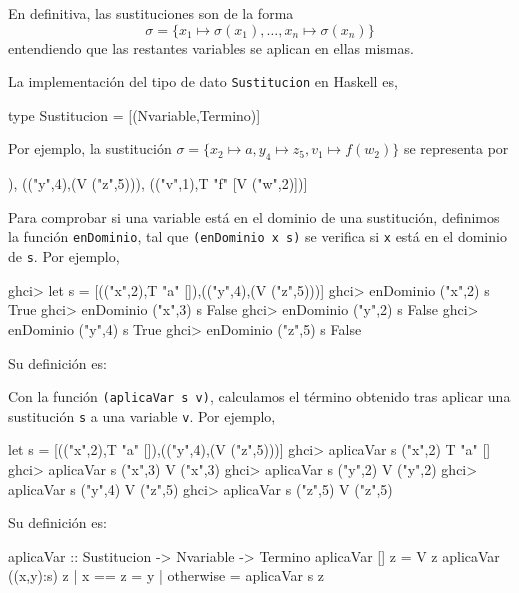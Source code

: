 En definitiva, las sustituciones son de la forma
$$\sigma = \{ x_1 \mapsto \sigma(x_1), \dots, x_n \mapsto \sigma(x_n)\}$$ 
entendiendo que las restantes variables se aplican en ellas mismas.

La implementación del tipo de dato
\texttt{Sustitucion} en Haskell es,

\begin{codigo}
  type Sustitucion = [(Nvariable,Termino)]
\end{codigo}

Por ejemplo, la sustitución
$\sigma = \{ x_2 \mapsto a, y_4 \mapsto z_5, v_1 \mapsto f(w_2) \}$ 
se representa por 
\begin{sesion}
[(("x",2),T "a" []),
 (("y",4),(V ("z",5))),
 (("v",1),T "f" [V ("w",2)])]
\end{sesion}

Para comprobar si una variable está en el dominio de una sustitución, definimos
la función \texttt{enDominio}, tal que \texttt{(enDominio x s)} se verifica si
\texttt{x} está en el dominio de \texttt{s}. Por ejemplo,

\begin{sesion}
ghci> let s = [(("x",2),T "a" []),(("y",4),(V ("z",5)))]
ghci> enDominio ("x",2) s
True
ghci> enDominio ("x",3) s
False
ghci> enDominio ("y",2) s
False
ghci> enDominio ("y",4) s
True
ghci> enDominio ("z",5) s
False
\end{sesion}

Su definición es:


Con la función \texttt{(aplicaVar s v)}, calculamos el término
obtenido tras aplicar una sustitución \texttt{s} a una variable
\texttt{v}. Por ejemplo,

\begin{sesion}
let s = [(("x",2),T "a" []),(("y",4),(V ("z",5)))]
ghci> aplicaVar s ("x",2)
T "a" []
ghci> aplicaVar s ("x",3)
V ("x",3)
ghci> aplicaVar s ("y",2)
V ("y",2)
ghci> aplicaVar s ("y",4)
V ("z",5)
ghci> aplicaVar s ("z",5)
V ("z",5)
\end{sesion}

Su definición es:

\begin{codigo}
aplicaVar :: Sustitucion -> Nvariable -> Termino 
aplicaVar [] z = V z 
aplicaVar ((x,y):s) z 
  | x == z    = y
  | otherwise = aplicaVar s z
\end{codigo}

